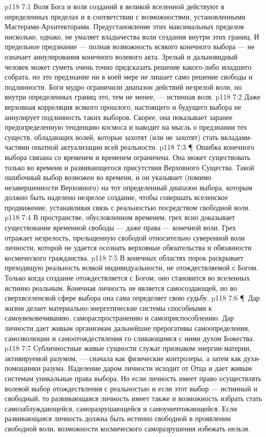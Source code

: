 \vs p118 7:1 Воля Бога и воля созданий в великой вселенной действуют в определенных пределах и в соответствии с возможностями, установленными Мастерами\hyp{}Архитекторами. Предустановление этих максимальных пределов нисколько, однако, не умаляет владычества воли создания внутри этих границ. И предельное предзнание --- полная возможность всякого конечного выбора --- не означает аннулирования конечного волевого акта. Зрелый и дальновидный человек может суметь очень точно предсказать решение какого\hyp{}либо младшего собрата, но это предзнание ни в коей мере не лишает само решение свободы и подлинности. Боги мудро ограничили диапазон действий незрелой воли, но внутри определенных границ это, тем не менее, --- истинная воля.
\vs p118 7:2 Даже верховная корреляция всякого прошлого, настоящего и будущего выбора не аннулирует подлинность таких выборов. Скорее, она показывает заранее предопределенную тенденцию космоса и наводит на мысль о предзнании тех существ, обладающих волей, которые захотят (или не захотят) стать вкладами\hyp{}частями опытной актуализации всей реальности.
\vs p118 7:3 \P\ Ошибка конечного выбора связана со временем и временем ограничена. Она может существовать только во времени и  развивающегося присутствия Верховного Существа. Такой ошибочный выбор возможен во времени, и он указывает (помимо незавершенности Верховного) на тот определенный диапазон выбора, которым должно быть наделено незрелое создание, чтобы совершать вселенское продвижение, устанавливая связь с реальностью посредством свободной воли.
\vs p118 7:4 В пространстве, обусловленном временем, грех ясно доказывает существование временной свободы --- даже права --- конечной воли. Грех отражает незрелость, прельщенную свободой относительно суверенной воли личности, которой не удается осознать верховные обязательства и обязанности космического гражданства.
\vs p118 7:5 В конечных областях порок раскрывает преходящую реальность всякой индивидуальности, не отождествляемой с Богом. Только когда создание отождествляется с Богом, оно становится во вселенных истинно реальным. Конечная личность не является самосоздающей, но во сверхвселенской сфере выбора она сама определяет свою судьбу.
\vs p118 7:6 \P\ Дар жизни делает материально\hyp{}энергетические системы способными к самоувековечиванию, самораспространению и самоприспособлению. Дар личности дает живым организмам дальнейшие прерогативы самоопределения, самоэволюции и самоотождествления со сливающимся с ними духом Божества.
\vs p118 7:7 Субличностные живые сущности служат признаком энергии\hyp{}материи, активируемой разумом, --- сначала как физические контролеры, а затем как духи\hyp{}помощники разума. Наделение даром личности исходит от Отца и дает живым системам уникальные права выбора. Но если личность имеет право осуществлять волевой выбор отождествления с реальностью и если этот выбор --- истинный и свободный, то развивающаяся личность имеет также и возможность избрать стать самозаблуждающейся, саморазрушающейся и самоуничтожающейся. Если развивающаяся личность должна быть истинно свободной в проявлении свободной воли, возможности космического саморазрушения избежать нельзя.
